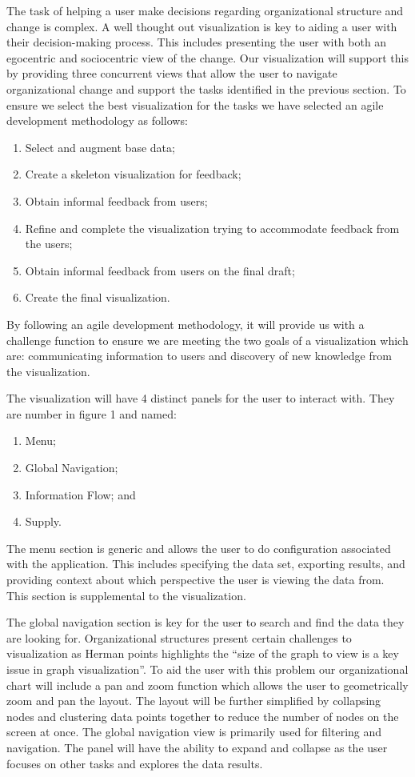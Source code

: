 \documentclass{soups}
\begin{document}
The task of helping a user make decisions regarding organizational structure and change is complex.  A well thought out visualization is key to aiding a user with their decision-making process.  This includes presenting the user with both an egocentric and sociocentric view of the change.  Our visualization will support this by providing three concurrent views that allow the user to navigate organizational change and support the tasks identified in the previous section.  To ensure we select the best visualization for the tasks we have selected an agile development methodology as follows:
\begin{enumerate}
\item Select and augment base data;
\item Create a skeleton visualization for feedback;
\item Obtain informal feedback from users;
\item Refine and complete the visualization trying to accommodate feedback from the users;
\item Obtain informal feedback from users on the final draft;
\item Create the final visualization.
\end{enumerate}

By following an agile development methodology, it will provide us with a challenge function to ensure we are meeting the two goals of a visualization which are: communicating information to users and discovery of new knowledge from the visualization. 

The visualization will have 4 distinct panels for the user to interact with.  They are number in figure 1 and named:
\begin{enumerate}
\item Menu;
\item Global Navigation;
\item Information Flow; and
\item Supply.
\end{enumerate}

The menu section is generic and allows the user to do configuration associated with the application.  This includes specifying the data set, exporting results, and providing context about which perspective the user is viewing the data from.  This section is supplemental to the visualization.

The global navigation section is key for the user to search and find the data they are looking for.  Organizational structures present certain challenges to visualization as Herman points highlights the “size of the graph to view is a key issue in graph visualization”\cite{herman2000graph}.  To aid the user with this problem our organizational chart will include a pan and zoom function which allows the user to geometrically zoom and pan the layout.  The layout will be further simplified by collapsing nodes and clustering data points together to reduce the number of nodes on the screen at once.  The global navigation view is primarily used for filtering and navigation.  The panel will have the ability to expand and collapse as the user focuses on other tasks and explores the data results.
\end{document}
